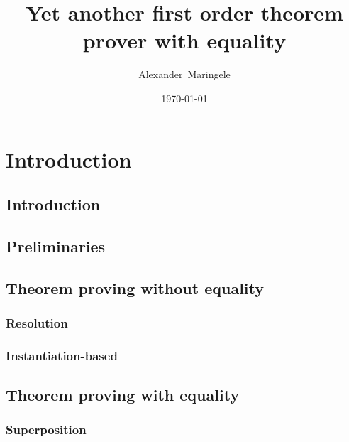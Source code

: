 \documentclass[]{clmthesis}
\begin{document}
\nocite{Ramsey01011930}

\title{Yet another first order theorem prover with equality}
\author{Alexander~Maringele}
\date{\today}
\maketitle
\tableofcontents

\chapter{Introduction} 			
\section{Introduction}

\section{Preliminaries}
\section{Theorem proving without equality}
\subsection{Resolution}
\subsection{Instantiation-based}
\section{Theorem proving with equality}
\subsection{Superposition}
\end{document}
